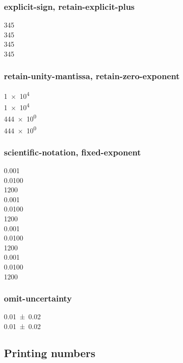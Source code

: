 \documentclass{article}
\begin{document}
\subsubsection{explicit-sign, retain-explicit-plus}
\num{+345} \\
\num[retain-explicit-plus]{+345} \\
\num[explicit-sign = -]{345}\\
\num[explicit-sign = -]{+345}\\

\subsubsection{retain-unity-mantissa, retain-zero-exponent}
\num{1e4} \\
\num[retain-unity-mantissa = false]{1e4} \\
\num{444e0} \\
\num[retain-zero-exponent = true]{444e0}\\

\subsubsection{scientific-notation, fixed-exponent}
{
\num{0.001}\\
\num{0.0100} \\
\num{1200}\\
%
\num{0.001}\\
\num{0.0100} \\
\num{1200}\\
%
\num{0.001}\\
\num{0.0100} \\
\num{1200}\\
%
\num{0.001}\\
\num{0.0100} \\
\num{1200}\\
}

\subsubsection{omit-uncertainty}
\num{0.01(2)} \\
\num[omit-uncertainty]{0.01(2)}\\

\subsection{Printing numbers}
\end{document}
